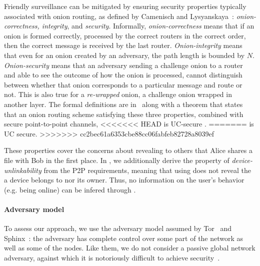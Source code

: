 Friendly surveillance can be mitigated by ensuring security properties 
typically associated with onion routing, as defined by Camenisch and Lysyanskaya~\cite{CLOnionRouting}: 
\textit{onion-correctness, integrity}, and \textit{security}. %
Informally, \textit{onion-correctness} means that if an onion is formed
correctly, processed by the correct routers in the correct order, then
the correct message is received by the last router. \textit{Onion-integrity}
means that even for an onion created by an adversary, the path length
is bounded by $N$. \textit{Onion-security} means that an adversary sending a
challenge onion  to a router and able to see the outcome of how the
onion is processed, cannot distinguish between whether that onion
corresponds to a particular message and route or not. This is also
true for a \emph{re-wrapped} onion, \ie a challenge onion wrapped in
another layer. The formal definitions are in~\cite{CLOnionRouting} along
with a theorem that states that an onion routing scheme satisfying
these three properties, combined with secure point-to-point channels,
<<<<<<< HEAD
is UC-secure .
=======
is UC secure.
>>>>>>> cc2bec61a6353cbe88cc06fabfeb82728a8039ef

These properties cover the concerns about
revealing to others that Alice shares a file with Bob in the first
place. In \name, we additionally derive the property of
\emph{device-unlinkability} from the \ac{P2P} requirements, meaning that
using \name does not reveal the \squad a device belongs to nor its
owner. Thus, no information on the user's behavior (e.g. being online)
can be infered through \name. 



\paragraph*{Adversary model} To assess our approach, we use the
adversary model assumed by Tor~\cite{Tor} and Sphinx~\cite{Sphinx}:
the adversary has complete control over some part of the network as
well as some of the nodes. Like them, we do not consider a passive global network
adversary, against which it is notoriously difficult to achieve
security~\cite{SystemsForAnonymousCommunication}.
